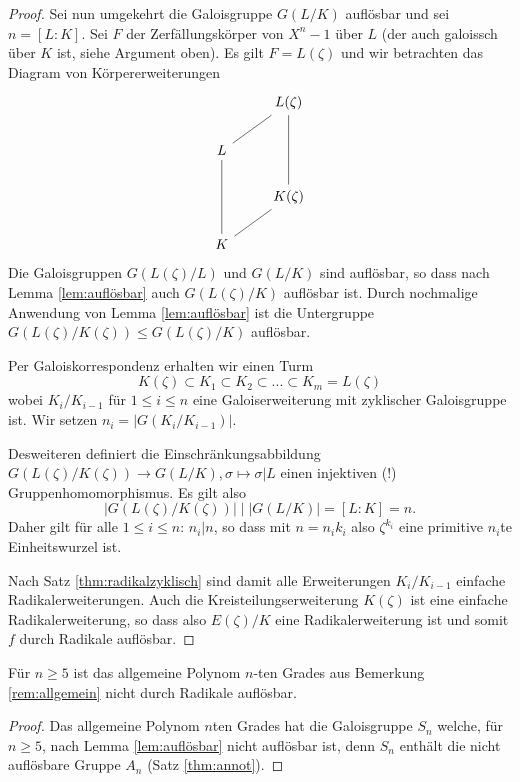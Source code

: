 \documentclass{book}
\begin{document}
\begin{proof}
    Sei nun umgekehrt die Galoisgruppe $G(L/K)$ auflösbar und sei $n = [L:K]$.
    Sei $F$ der Zerfällungskörper von $X^n -1 $ über $L$ (der auch
    galoissch über $K$ ist, siehe Argument oben). Es gilt $F = L(\zeta)$ und
    wir betrachten das Diagram von Körpererweiterungen
    \[
    \begin{tikzcd}
            & L(\zeta)\\
         L\ar[dash]{ur}    & \\
         &  K(\zeta) \ar[dash]{uu}\\
        K \ar[dash]{ur}\ar[dash]{uu} & 
    \end{tikzcd}
    \]
    Die Galoisgruppen $G(L(\zeta)/L)$ und $G(L/K)$ sind auflösbar, so dass nach
    Lemma \ref{lem:auflösbar} auch $G(L(\zeta)/K)$ auflösbar ist. Durch
    nochmalige Anwendung von Lemma \ref{lem:auflösbar} ist die Untergruppe
    $G(L(\zeta)/K(\zeta)) \le G(L(\zeta)/K)$ auflösbar. 

    Per Galoiskorrespondenz erhalten wir einen Turm
    \[
        K(\zeta) \subset K_1 \subset K_2 \subset ... \subset K_m = L(\zeta)
    \]
    wobei $K_i/K_{i-1}$ für $1 \le i \le n$ eine Galoiserweiterung mit
    zyklischer Galoisgruppe ist. Wir setzen $n_i = |G(K_i/K_{i-1})|$. 

    Desweiteren definiert die Einschränkungsabbildung $G(L(\zeta)/K(\zeta)) \to
    G(L/K), \sigma \mapsto \sigma|L$ einen injektiven (!) Gruppenhomomorphismus. Es gilt also 
    \[
        |G(L(\zeta)/K(\zeta))| \mid |G(L/K)| = [L:K] = n.
    \]
    Daher gilt für alle $1 \le i \le n$: $n_i | n$, so dass mit $n = n_i k_i$
    also $\zeta^{k_i}$ eine primitive $n_i$te Einheitswurzel ist. 

    Nach Satz \ref{thm:radikalzyklisch} sind damit alle Erweiterungen
    $K_i/K_{i-1}$ einfache Radikalerweiterungen. Auch die
    Kreisteilungserweiterung $K(\zeta)$ ist eine einfache Radikalerweiterung,
    so dass also $E(\zeta)/K$ eine Radikalerweiterung ist und somit $f$ durch Radikale auflösbar. 
\end{proof}

\begin{cor}
    \label{cor:allg}
    Für $n \ge 5$ ist das allgemeine Polynom $n$-ten Grades aus Bemerkung
    \ref{rem:allgemein} nicht durch Radikale auflösbar. 
\end{cor}
\begin{proof}
    Das allgemeine Polynom $n$ten Grades hat die Galoisgruppe $S_n$ welche, für
    $n \ge 5$, nach Lemma \ref{lem:auflösbar} nicht auflösbar ist, denn $S_n$
    enthält die nicht auflösbare Gruppe $A_n$ (Satz \ref{thm:annot}).
\end{proof}

\printindex
\end{document}
